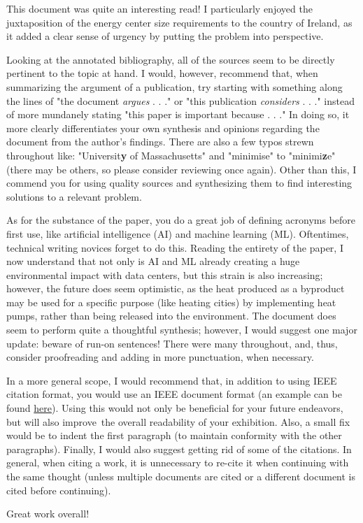 \documentclass[letterpaper,11pt]{texMemo} %
\begin{document}
\maketitle %


This document was quite an interesting read! I particularly enjoyed the juxtaposition of the energy center size requirements to the country of Ireland, as it added a clear sense of urgency by putting the problem into perspective.

Looking at the annotated bibliography, all of the sources seem to be directly pertinent to the topic at hand. I would, however, recommend that, when summarizing the argument of a publication, try starting with something along the lines of "the document \textit{argues} . . ." or "this publication \textit{considers} . . ." instead of more mundanely stating "this paper is important because . . ." In doing so, it more clearly differentiates your own synthesis and opinions regarding the document from the author's findings. There are also a few typos strewn throughout like: "Universit\textbf{y} of Massachusetts" and "minimise" to "minimi\textbf{z}e" (there may be others, so please consider reviewing once again). Other than this, I commend you for using quality sources and synthesizing them to find interesting solutions to a relevant problem.

As for the substance of the paper, you do a great job of defining acronyms before first use, like artificial intelligence (AI) and machine learning (ML). Oftentimes, technical writing novices forget to do this. Reading the entirety of the paper, I now understand that not only is AI and ML already creating a huge environmental impact with data centers, but this strain is also increasing; however, the future does seem optimistic, as the heat produced as a byproduct may be used for a specific purpose (like heating cities) by implementing heat pumps, rather than being released into the environment. The document does seem to perform quite a thoughtful synthesis; however, I would suggest one major update: beware of run-on sentences! There were many throughout, and, thus, consider proofreading and adding in more punctuation, when necessary.

In a more general scope, I would recommend that, in addition to using IEEE citation format, you would use an IEEE document format (an example can be found \href{https://www.IEEE.org/conference/publishing/templates.HTML}{here}). Using this would not only be beneficial for your future endeavors, but will also improve the overall readability of your exhibition. Also, a small fix would be to indent the first paragraph (to maintain conformity with the other paragraphs). Finally, I would also suggest getting rid of some of the citations. In general, when citing a work, it is unnecessary to re-cite it when continuing with the same thought (unless multiple documents are cited or a different document is cited before continuing).

Great work overall!

\end{document}

